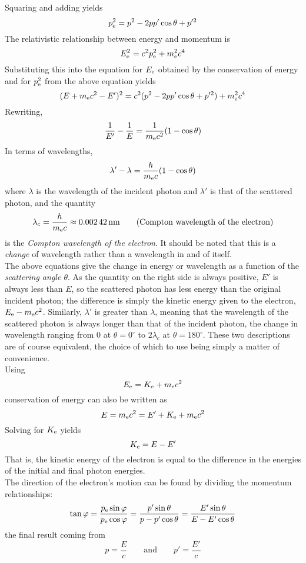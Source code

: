 \documentclass{subfiles}
\begin{document}
				Squaring and adding yields
				\[p_{\text{e}}^2 = p^2 - 2pp'\cos\theta + p'^2\]
				The relativistic relationship between energy and momentum is
				\[E_{\text{e}}^2 = c^2p_{\text{e}}^2 + m_{\text{e}}^2c^4\]
				Substituting this into the equation for \(E_{\text{e}}\) obtained by the conservation of energy and for \(p_{\text{e}}^2\) from the above equation yields
				\[(E + m_{\text{e}}c^2 - E')^2 = c^2(p^2 - 2pp'\cos\theta + p'^2) + m_{\text{e}}^2c^4\]
				Rewriting,
				\[\frac{1}{E'} - \frac{1}{E} = \frac{1}{m_{\text{e}}c^2}(1 - \cos\theta)\]
				In terms of wavelengths,
				\[\lambda' - \lambda = \frac{h}{m_{\text{e}}c}(1 - \cos\theta)\]
				where \(\lambda\) is the wavelength of the incident photon and \(\lambda'\) is that of the scattered photon, and the quantity
				\[
					\lambda_c = \frac{h}{m_{\text{e}}c}
						\approx \SI{0.00242}{nm}
						\tag{Compton wavelength of the electron}
				\]
				is the \textit{Compton wavelength of the electron}. It should be noted that this is a \textit{change} of wavelength rather than a wavelength in and of itself. \\
				The above equations give the change in energy or wavelength as a function of the \textit{scattering angle \(\theta\)}. As the quantity on the right side is always positive, \(E'\) is always less than \(E\), so the scattered photon has less energy than the original incident photon; the difference is simply the kinetic energy given to the electron, \(E_{\text{e}} - m_{\text{e}}c^2\). Similarly, \(\lambda'\) is greater than \(\lambda\), meaning that the wavelength of the scattered photon is always longer than that of the incident photon, the change in wavelength ranging from 0 at \(\theta = 0^\circ\) to \(2\lambda_c\) at \(\theta = 180^\circ\). These two descriptions are of course equivalent, the choice of which to use being simply a matter of convenience. \\
				Using
				\[E_{\text{e}} = K_{\text{e}} + m_{\text{e}}c^2\]
				conservation of energy can also be written as
				\[E = m_{\text{e}}c^2 = E' + K_{\text{e}} + m_{\text{e}}c^2\]
				Solving for \(K_{\text{e}}\) yields
				\[K_{\text{e}} = E - E'\]
				That is, the kinetic energy of the electron is equal to the difference in the energies of the initial and final photon energies. \\
				The direction of the electron's motion can be found by dividing the momentum relationships:
				\[
					\tan\varphi = \frac{p_{\text{e}}\sin\varphi}{p_{\text{e}}\cos\varphi}
						= \frac{p'\sin\theta}{p - p'\cos\theta}
						= \frac{E'\sin\theta}{E - E'\cos\theta}
				\]
				the final result coming from
				\[
					p = \frac{E}{c} \qquad \text{and} \qquad
						p' = \frac{E'}{c}
				\]
\end{document}
